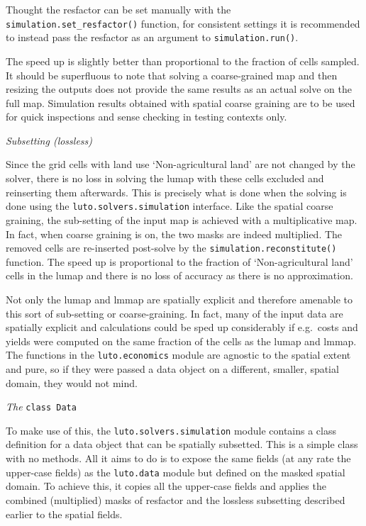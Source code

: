 \documentclass{draft}
\begin{document}
Thought the resfactor can be set manually with the \texttt{simulation.set_resfactor()} function, for consistent settings it is recommended to instead pass the resfactor as an argument to \texttt{simulation.run()}.

The speed up is slightly better than proportional to the fraction of cells sampled. It should be superfluous to note that solving a coarse-grained map and then resizing the outputs does not provide the same results as an actual solve on the full map. Simulation results obtained with spatial coarse graining are to be used for quick inspections and sense checking in testing contexts only.

\emph{Subsetting (lossless)}

Since the grid cells with land use `Non-agricultural land' are not changed by the solver, there is no loss in solving the lumap with these cells excluded and reinserting them afterwards. This is precisely what is done when the solving is done using the \texttt{luto.solvers.simulation} interface. Like the spatial coarse graining, the sub-setting of the input map is achieved with a multiplicative map. In fact, when coarse graining is on, the two masks are indeed multiplied. The removed cells are re-inserted post-solve by the \texttt{simulation.reconstitute()} function. The speed up is proportional to the fraction of `Non-agricultural land' cells in the lumap and there is no loss of accuracy as there is no approximation.

Not only the lumap and lmmap are spatially explicit and therefore amenable to this sort of sub-setting or coarse-graining. In fact, many of the input data are spatially explicit and calculations could be sped up considerably if e.g.\ costs and yields were computed on the same fraction of the cells as the lumap and lmmap. The functions in the \texttt{luto.economics} module are agnostic to the spatial extent and pure, so if they were passed a data object on a different, smaller, spatial domain, they would not mind.

\emph{The} \texttt{class Data}

To make use of this, the \texttt{luto.solvers.simulation} module contains a class definition for a data object that can be spatially subsetted. This is a simple class with no methods. All it aims to do is to expose the same fields (at any rate the upper-case fields) as the \texttt{luto.data} module but defined on the masked spatial domain. To achieve this, it copies all the upper-case fields and applies the combined (multiplied) masks of resfactor and the lossless subsetting described earlier to the spatial fields.
\end{document}
